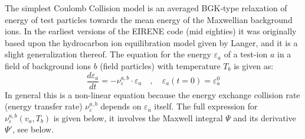 The simplest Coulomb Collision model is an averaged \acs{BGK}-type relaxation
of energy of test particles towards the mean energy of the Maxwellian
background ions.
In the earliest versions of the EIRENE code (mid eighties) it was originally
based upon the hydrocarbon ion equilibration model given by Langer,
\cite{kn:Langer} and it is a slight generalization thereof.
The equation for the energy $\varepsilon_a$ of a test-ion $a$ in a field of
background ions $b$ (field particles) with temperature $T_b$ is given as:
\begin{equation}
  \label{eq.relax1}
  \frac{d\varepsilon_a}{dt}=-\nu_\varepsilon^{a,b} \cdot
  \varepsilon_a  \quad, \quad  \varepsilon_a(t=0)=\varepsilon_a^0
\end{equation}
In general this is a non-linear equation because the energy exchange collision
rate (energy transfer rate) $\nu_\varepsilon^{a,b}$ depends on $\varepsilon_a$
itself.
The full expression for $\nu_\varepsilon^{a,b}(v_a, T_b)$ is given below, it
involves the Maxwell integral $\Psi$ and its derivative $\Psi'$, see below.

